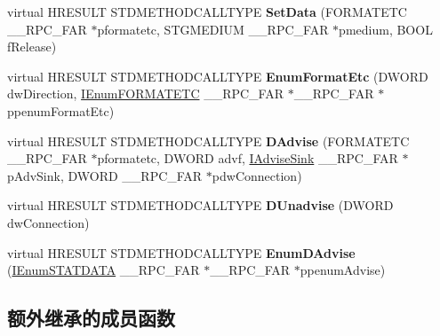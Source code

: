\begin{DoxyCompactItemize}
\item 
\mbox{\label{class_i_data_object_impl_a44e90dd0fbb8cf34878b2c2787d71b7c}} 
virtual H\+R\+E\+S\+U\+LT S\+T\+D\+M\+E\+T\+H\+O\+D\+C\+A\+L\+L\+T\+Y\+PE {\bfseries Set\+Data} (F\+O\+R\+M\+A\+T\+E\+TC \+\_\+\+\_\+\+R\+P\+C\+\_\+\+F\+AR $\ast$pformatetc, S\+T\+G\+M\+E\+D\+I\+UM \+\_\+\+\_\+\+R\+P\+C\+\_\+\+F\+AR $\ast$pmedium, B\+O\+OL f\+Release)
\item 
\mbox{\label{class_i_data_object_impl_a592345fdcf23f52d6c480f95c9cc5fc0}} 
virtual H\+R\+E\+S\+U\+LT S\+T\+D\+M\+E\+T\+H\+O\+D\+C\+A\+L\+L\+T\+Y\+PE {\bfseries Enum\+Format\+Etc} (D\+W\+O\+RD dw\+Direction, \hyperlink{interface_i_enum_f_o_r_m_a_t_e_t_c}{I\+Enum\+F\+O\+R\+M\+A\+T\+E\+TC} \+\_\+\+\_\+\+R\+P\+C\+\_\+\+F\+AR $\ast$\+\_\+\+\_\+\+R\+P\+C\+\_\+\+F\+AR $\ast$ppenum\+Format\+Etc)
\item 
\mbox{\label{class_i_data_object_impl_a9d4edd8d34bf3914f1711eacfff0ca0d}} 
virtual H\+R\+E\+S\+U\+LT S\+T\+D\+M\+E\+T\+H\+O\+D\+C\+A\+L\+L\+T\+Y\+PE {\bfseries D\+Advise} (F\+O\+R\+M\+A\+T\+E\+TC \+\_\+\+\_\+\+R\+P\+C\+\_\+\+F\+AR $\ast$pformatetc, D\+W\+O\+RD advf, \hyperlink{interface_i_advise_sink}{I\+Advise\+Sink} \+\_\+\+\_\+\+R\+P\+C\+\_\+\+F\+AR $\ast$p\+Adv\+Sink, D\+W\+O\+RD \+\_\+\+\_\+\+R\+P\+C\+\_\+\+F\+AR $\ast$pdw\+Connection)
\item 
\mbox{\label{class_i_data_object_impl_af631240341a59b8928e3dacbd590a4bd}} 
virtual H\+R\+E\+S\+U\+LT S\+T\+D\+M\+E\+T\+H\+O\+D\+C\+A\+L\+L\+T\+Y\+PE {\bfseries D\+Unadvise} (D\+W\+O\+RD dw\+Connection)
\item 
\mbox{\label{class_i_data_object_impl_ab7818128718ad0b4ecdc704692f0293c}} 
virtual H\+R\+E\+S\+U\+LT S\+T\+D\+M\+E\+T\+H\+O\+D\+C\+A\+L\+L\+T\+Y\+PE {\bfseries Enum\+D\+Advise} (\hyperlink{interface_i_enum_s_t_a_t_d_a_t_a}{I\+Enum\+S\+T\+A\+T\+D\+A\+TA} \+\_\+\+\_\+\+R\+P\+C\+\_\+\+F\+AR $\ast$\+\_\+\+\_\+\+R\+P\+C\+\_\+\+F\+AR $\ast$ppenum\+Advise)
\end{DoxyCompactItemize}
\subsection*{额外继承的成员函数}


